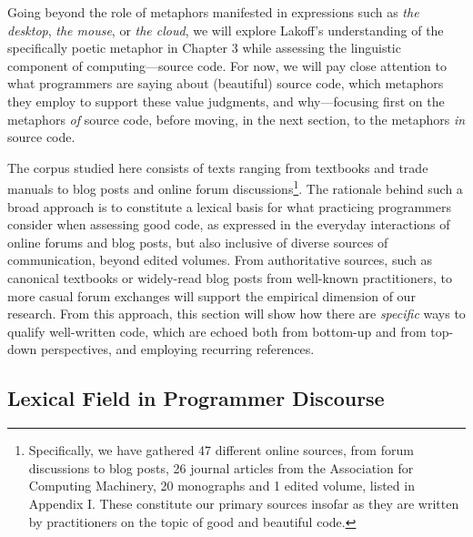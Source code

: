Going beyond the role of metaphors manifested in expressions such as \emph{the desktop}, \emph{the mouse}, or \emph{the cloud}, we will explore Lakoff's understanding of the specifically poetic metaphor in Chapter 3 while assessing the linguistic component of computing—source code. For now, we will pay close attention to what programmers are saying about (beautiful) source code, which metaphors they employ to support these value judgments, and why—focusing first on the metaphors \emph{of} source code, before moving, in the next section, to the metaphors \emph{in} source code.

The corpus studied here consists of texts ranging from textbooks and trade manuals to blog posts and online forum discussions\footnote{Specifically, we have gathered 47 different online sources, from forum discussions to blog posts, 26 journal articles from the Association for Computing Machinery, 20 monographs and 1 edited volume, listed in Appendix I. These constitute our primary sources insofar as they are written by practitioners on the topic of good and beautiful code.}. The rationale behind such a broad approach is to constitute a lexical basis for what practicing programmers consider when assessing good code, as expressed in the everyday interactions of online forums and blog posts, but also inclusive of diverse sources of communication, beyond edited volumes. From authoritative sources, such as canonical textbooks or widely-read blog posts from well-known practitioners, to more casual forum exchanges will support the empirical dimension of our research. From this approach, this section will show how there are \emph{specific} ways to qualify well-written code, which are echoed both from bottom-up and from top-down perspectives, and employing recurring references.

\subsection{Lexical Field in Programmer Discourse}
\label{subsec:lexical-fields}

